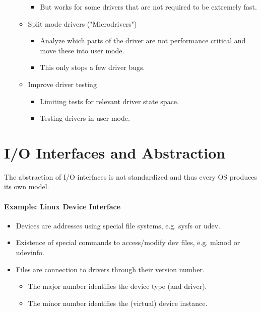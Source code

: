 \begin{itemize}
\begin{itemize}
\begin{itemize}
	            			\item But works for some drivers that are not required to be extremely fast.
	            		\end{itemize}
            		\item Split mode drivers ("Microdrivers")
	            		\begin{itemize}
	            			\item Analyze which parts of the driver are not performance critical and move these into user mode.
	            			\item This only stops a few driver bugs.
	            		\end{itemize}
            		\item Improve driver testing
	            		\begin{itemize}
	            			\item Limiting tests for relevant driver state space.
	            			\item Testing drivers in user mode.
	            		\end{itemize}
            	\end{itemize}
        \end{itemize}

    \section{I/O Interfaces and Abstraction}
        The abstraction of I/O interfaces is not standardized and thus every OS produces its own model.

		\paragraph{Example: Linux Device Interface}
			\begin{itemize}
				\item Devices are addresses using special file systems, e.g. sysfs or udev.
				\item Existence of special commands to access/modify dev files, e.g. mknod or udevinfo.
				\item Files are connection to drivers through their version number.
					\begin{itemize}
						\item The major number identifies the device type (and driver).
						\item The minor number identifies the (virtual) device instance.
					\end{itemize}
			\end{itemize}

